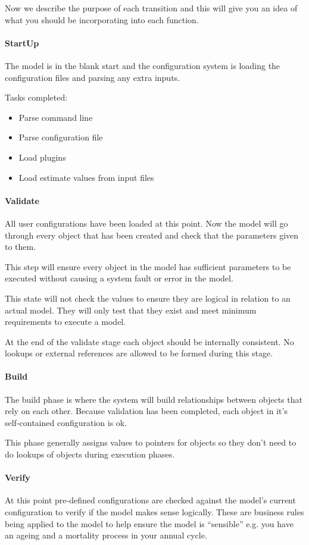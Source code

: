 Now we describe the purpose of each transition and this will give you an idea of what you should be incorporating into each function.

\paragraph*{StartUp}
The model is in the blank start and the configuration system is loading the configuration files and parsing any extra inputs.

Tasks completed:
\begin{itemize}
	\item Parse command line
	\item Parse configuration file
	\item Load plugins
	\item Load estimate values from input files
\end{itemize}

\paragraph*{Validate}
All user configurations have been loaded at this point. Now the model will go through every object that has been created and check that the parameters given to them.

This step will ensure every object in the model has sufficient parameters to be executed without causing a system fault or error in the model.

This state will not check the values to ensure they are logical in relation to an actual model. They will only test that they exist and meet minimum requirements to execute a model.

At the end of the validate stage each object should be internally consistent. No lookups or external references are allowed to be formed during this stage.

\paragraph*{Build}
The build phase is where the system will build relationships between objects that rely on each other. Because validation has been completed, each object in it's self-contained configuration is ok.

This phase generally assigns values to pointers for objects so they don't need to do lookups of objects during execution phases.

\paragraph*{Verify}
At this point pre-defined configurations are checked against the model's current configuration to verify if the model makes sense logically. These are business rules being applied to the model to help ensure the model is \enquote{sensible} e.g. you have an ageing and a mortality process in your annual cycle.

